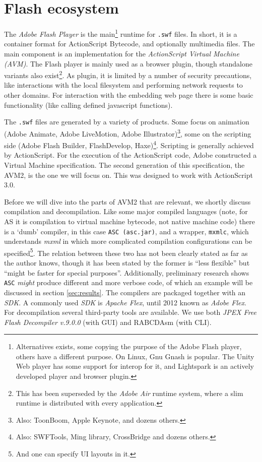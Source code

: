 \documentclass[a4paper,11pt]{scrartcl}
\begin{document}
\section{Flash ecosystem}
\label{sec:ecosystem}
The \textit{Adobe Flash Player} is the main\footnote{Alternatives exists, some copying the purpose of the Adobe Flash player, others have a different purpose.  On Linux, Gnu Gnash is popular. The Unity Web player has some support for interop for it, and Lightspark is an actively developed player and browser plugin. } runtime for \texttt{.swf} files. In short, it is a container format for ActionScript Bytecode, and optionally multimedia files. The main component is an implementation for the \textit{ActionScript Virtual Machine (AVM)}. The Flash player is mainly used as a browser plugin, though standalone variants also exist\footnote{This has been superseded by the \textit{Adobe Air} runtime system, where a slim runtime is distributed with every application.}. As plugin, it is limited by a number of security precautions, like interactions with the local filesystem and performing network requests to other domains. For interaction with the embedding web page there is some basic functionality (like calling defined javascript functions).

The \texttt{.swf} files are generated by a variety of products. Some focus on animation (Adobe Animate, Adobe LiveMotion, Adobe Illustrator)\footnote{Also: ToonBoom, Apple Keynote, and dozens others.}, some on the scripting side (Adobe Flash Builder, FlashDevelop, Haxe)\footnote{Also: SWFTools, Ming library, CrossBridge and dozens others.}. Scripting is generally achieved by ActionScript. For the execution of the ActionScript code, Adobe constructed a Virtual Machine specification. The second generation of this specification, the AVM2, is the one we will focus on. This was designed to work with ActionScript 3.0.

Before we will dive into the parts of AVM2 that are relevant, we shortly discuss compilation and decompilation. Like some major compiled languages (note, for AS it is compilation to virtual machine bytecode, not native machine code) there is a `dumb' compiler, in this case \texttt{ASC (asc.jar)}, and a wrapper, \texttt{mxmlc}, which understands \textit{mxml} in which more complicated compilation configurations can be specified\footnote{And one can specify UI layouts in it.}. The relation between these two has not been clearly stated as far as the author knows, though it has been stated by \cite{smith2009} the former is ``less flexible'' but ``might be faster for special purposes''. Additionally, preliminary research shows \texttt{ASC} \textit{might} produce different and more verbose code, of which an example will be discussed in section \ref{sec:results}. The compilers are packaged together with an \textit{SDK}. A commonly used \textit{SDK} is \textit{Apache Flex}, until 2012 known as \textit{Adobe Flex}. For decompilation several third-party tools are available. We use both \textit{JPEX Free Flash Decompiler v.9.0.0} (with GUI) and RABCDAsm (with CLI).
\end{document}
